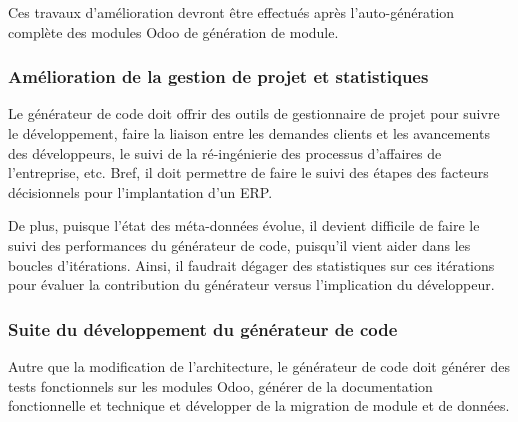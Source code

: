 



Ces travaux d’amélioration devront être effectués après l’auto-génération complète des modules Odoo de génération de module.

\subsubsection{Amélioration de la gestion de projet et statistiques}

Le générateur de code doit offrir des outils de gestionnaire de projet pour suivre le développement, faire la liaison entre les demandes clients et les avancements des développeurs, le suivi de la ré-ingénierie des processus d'affaires de l'entreprise, etc. Bref, il doit permettre de faire le suivi des étapes des facteurs décisionnels pour l'implantation d'un ERP.

De plus, puisque l’état des méta-données évolue, il devient difficile de faire le suivi des performances du générateur de code, puisqu’il vient aider dans les boucles d’itérations. Ainsi, il faudrait dégager des statistiques sur ces itérations pour évaluer la contribution du générateur versus l'implication du développeur.


\subsubsection{Suite du développement du générateur de code}

Autre que la modification de l'architecture, le générateur de code doit générer des tests fonctionnels sur les modules Odoo, générer de la documentation fonctionnelle et technique et développer de la migration de module et de données.

